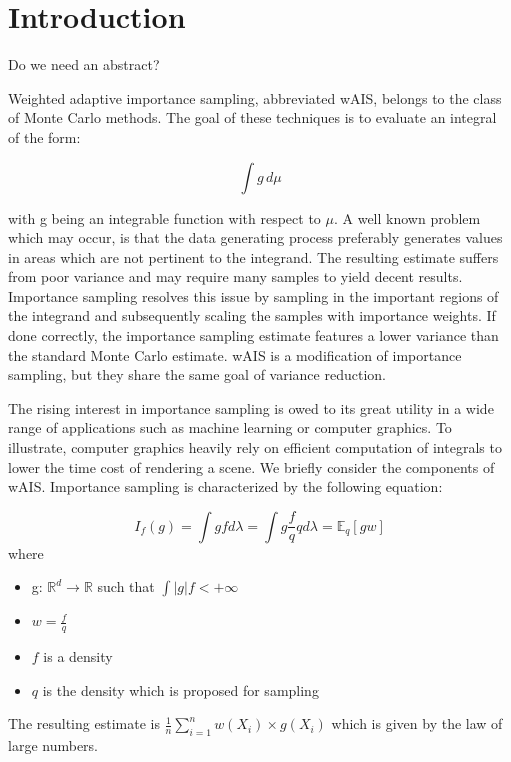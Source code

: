 \section{Introduction}


Do we need an abstract?


Weighted adaptive importance sampling, abbreviated wAIS, belongs to the class of Monte Carlo methods. The goal of these techniques is to evaluate an integral of the form: 

$$\displaystyle \int g \, d\mu$$

with g being an integrable function with respect to $\mu$. 
A well known problem which may occur, is that the data generating process preferably generates values in areas which are not pertinent to the integrand. The resulting estimate suffers from poor variance and may require many samples to yield decent results. Importance sampling resolves this issue by sampling in the important regions of the integrand and subsequently scaling the samples with importance weights. If done correctly, the importance sampling estimate features a lower variance than the standard Monte Carlo estimate. wAIS is a modification of importance sampling, but they share the same goal of variance reduction. 

The rising interest in importance sampling is owed to its great utility in a wide range of applications such as machine learning or computer graphics. To illustrate, computer graphics heavily rely on efficient computation of integrals to lower the time cost of rendering a scene. 
\newline
We briefly consider the components of wAIS.
Importance sampling is characterized by the following equation:




$$ I_f(g) = \displaystyle \int gf d\lambda = \int g \frac f q q d\lambda = \mathbb{E}_q [g w]
$$
where 
\begin{itemize}
    \item g: $\mathbb R^d \to \mathbb{R}$ such that $\int |g|f < +\infty$
    \item $w = \frac f q$
    \item $f$ is a density 
    \item $q$ is the density which is proposed for sampling
\end{itemize}

The resulting estimate is $\frac 1 n \displaystyle\sum\limits_{i=1}^n w(X_i) \times g(X_i)$
which is given by the law of large numbers.

